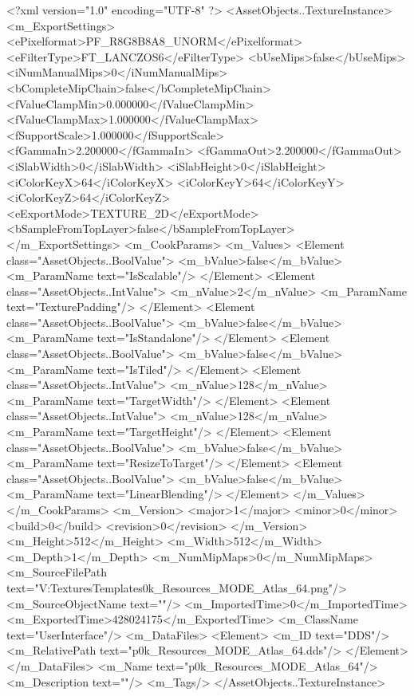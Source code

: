 <?xml version="1.0" encoding="UTF-8" ?>
<AssetObjects..TextureInstance>
	<m_ExportSettings>
		<ePixelformat>PF_R8G8B8A8_UNORM</ePixelformat>
		<eFilterType>FT_LANCZOS6</eFilterType>
		<bUseMips>false</bUseMips>
		<iNumManualMips>0</iNumManualMips>
		<bCompleteMipChain>false</bCompleteMipChain>
		<fValueClampMin>0.000000</fValueClampMin>
		<fValueClampMax>1.000000</fValueClampMax>
		<fSupportScale>1.000000</fSupportScale>
		<fGammaIn>2.200000</fGammaIn>
		<fGammaOut>2.200000</fGammaOut>
		<iSlabWidth>0</iSlabWidth>
		<iSlabHeight>0</iSlabHeight>
		<iColorKeyX>64</iColorKeyX>
		<iColorKeyY>64</iColorKeyY>
		<iColorKeyZ>64</iColorKeyZ>
		<eExportMode>TEXTURE_2D</eExportMode>
		<bSampleFromTopLayer>false</bSampleFromTopLayer>
	</m_ExportSettings>
	<m_CookParams>
		<m_Values>
			<Element class="AssetObjects..BoolValue">
				<m_bValue>false</m_bValue>
				<m_ParamName text="IsScalable"/>
			</Element>
			<Element class="AssetObjects..IntValue">
				<m_nValue>2</m_nValue>
				<m_ParamName text="TexturePadding"/>
			</Element>
			<Element class="AssetObjects..BoolValue">
				<m_bValue>false</m_bValue>
				<m_ParamName text="IsStandalone"/>
			</Element>
			<Element class="AssetObjects..BoolValue">
				<m_bValue>false</m_bValue>
				<m_ParamName text="IsTiled"/>
			</Element>
			<Element class="AssetObjects..IntValue">
				<m_nValue>128</m_nValue>
				<m_ParamName text="TargetWidth"/>
			</Element>
			<Element class="AssetObjects..IntValue">
				<m_nValue>128</m_nValue>
				<m_ParamName text="TargetHeight"/>
			</Element>
			<Element class="AssetObjects..BoolValue">
				<m_bValue>false</m_bValue>
				<m_ParamName text="ResizeToTarget"/>
			</Element>
			<Element class="AssetObjects..BoolValue">
				<m_bValue>false</m_bValue>
				<m_ParamName text="LinearBlending"/>
			</Element>
		</m_Values>
	</m_CookParams>
	<m_Version>
		<major>1</major>
		<minor>0</minor>
		<build>0</build>
		<revision>0</revision>
	</m_Version>
	<m_Height>512</m_Height>
	<m_Width>512</m_Width>
	<m_Depth>1</m_Depth>
	<m_NumMipMaps>0</m_NumMipMaps>
	<m_SourceFilePath text="V:\Civ Textures\Art Templates\Resources\Icons\Atlases\p0k_Resources_MODE_Atlas_64.png"/>
	<m_SourceObjectName text=""/>
	<m_ImportedTime>0</m_ImportedTime>
	<m_ExportedTime>428024175</m_ExportedTime>
	<m_ClassName text="UserInterface"/>
	<m_DataFiles>
		<Element>
			<m_ID text="DDS"/>
			<m_RelativePath text="p0k_Resources_MODE_Atlas_64.dds"/>
		</Element>
	</m_DataFiles>
	<m_Name text="p0k_Resources_MODE_Atlas_64"/>
	<m_Description text=""/>
	<m_Tags/>
</AssetObjects..TextureInstance>

